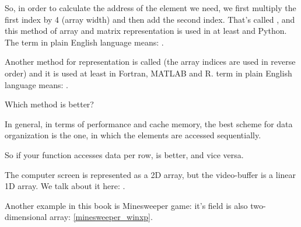 
So, in order to calculate the address of the element we need, we first multiply the first index by
4 (array width) and then add the second index.
That's called , 
and this method of array and matrix representation is used in at least \CCpp and Python. 
The term  
in plain English language means: .

Another method for representation is called  (the array indices are used in reverse order) 
and it is used at least in Fortran, MATLAB and R. 
 term in plain English language means: .

Which method is better?

In general, in terms of performance and cache memory, 
the best scheme for data organization is the one,
in which the elements are accessed sequentially.

So if your function accesses data per row,  is better, and vice versa.






The computer screen is represented as a 2D array, but the video-buffer is a linear 1D array. 
We talk about it here: .

Another example in this book is Minesweeper game: it's field is also two-dimensional array: \ref{minesweeper_winxp}.

